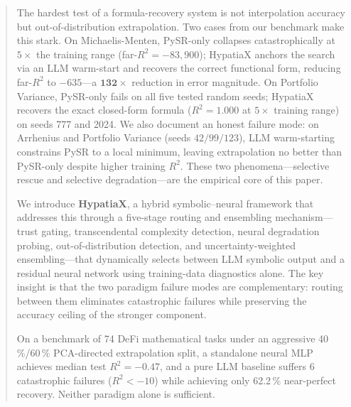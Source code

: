 \documentclass[twoside,11pt]{article}
\newcommand{\Rsq}{R^{2}}
\begin{document}
\begin{abstract}
The hardest test of a formula-recovery system is not interpolation accuracy but
out-of-distribution extrapolation.  Two cases from our benchmark make this stark.
On Michaelis-Menten, PySR-only collapses catastrophically at $5\times$ the
training range (far-$\Rsq = -83{,}900$); HypatiaX anchors the search via an
LLM warm-start and recovers the correct functional form, reducing far-$\Rsq$
to $-635$---a $\mathbf{132\times}$ reduction in error magnitude.  On Portfolio
Variance, PySR-only fails on all five tested random seeds; HypatiaX recovers
the exact closed-form formula ($\Rsq=1.000$ at $5\times$ training range) on
seeds 777 and 2024.  We also document an honest failure mode: on Arrhenius and
Portfolio Variance (seeds $42/99/123$), LLM warm-starting constrains PySR to a
local minimum, leaving extrapolation no better than PySR-only despite higher
training $\Rsq$.  These two phenomena---selective rescue and selective
degradation---are the empirical core of this paper.

We introduce \textbf{HypatiaX}, a hybrid symbolic--neural framework that
addresses this through a five-stage routing and ensembling mechanism---trust
gating, transcendental complexity detection, neural degradation probing,
out-of-distribution detection, and uncertainty-weighted ensembling---that
dynamically selects between LLM symbolic output and a residual neural network
using training-data diagnostics alone.  The key insight is that the two paradigm
failure modes are complementary: routing between them eliminates catastrophic
failures while preserving the accuracy ceiling of the stronger component.

On a benchmark of 74 DeFi mathematical tasks under an aggressive
40\,\%/60\,\% PCA-directed extrapolation split, a standalone neural MLP achieves
median test $\Rsq = -0.47$, and a pure LLM baseline suffers 6 catastrophic
failures ($\Rsq < -10$) while achieving only 62.2\,\% near-perfect recovery.
Neither paradigm alone is sufficient.


\end{abstract}
\end{document}
